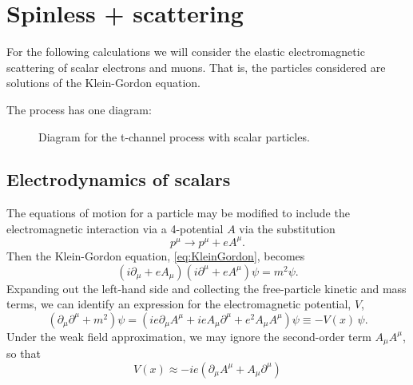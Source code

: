 \chapter{Spinless \Pelectron + \Pmuon scattering}
For the following calculations we will consider the elastic electromagnetic scattering of scalar electrons and muons. That is, the particles considered are solutions of the Klein-Gordon equation.

The process has one diagram:
\begin{figure}[h]
\centering

\caption{Diagram for the t-channel process \HepProcess{\Pelectron+\Pmuon\to\Pelectron+\Pmuon} with scalar particles.\label{fig:emuscatter}}
\end{figure}

\section{Electrodynamics of scalars}\label{sec:EMdynamics}
The equations of motion for a particle may be modified to include the electromagnetic interaction via a 4-potential $A$ via the substitution
\begin{equation}
p^\mu \rightarrow p^\mu + eA^\mu.
\end{equation}
Then the Klein-Gordon equation, \eqref{eq:KleinGordon}, becomes
\begin{equation}
\left( i\partial_\mu + eA_\mu \right)\left( i\partial^\mu + eA^\mu \right)\psi = m^2\psi.
\end{equation}
Expanding out the left-hand side and collecting the free-particle kinetic and mass terms, we can identify an expression for the electromagnetic potential, $V$,
\begin{equation}
\left( \partial_\mu\partial^\mu + m^2 \right)\psi = \left( ie\partial_\mu A^\mu + ieA_\mu\partial^\mu + e^2A_\mu A^\mu \right)\psi \equiv -V(x) \,\psi.
\end{equation}
Under the weak field approximation, we may ignore the second-order term $A_\mu A^\mu$, so that
\begin{equation}
V(x) \approx -ie\left( \partial_\mu A^\mu + A_\mu\partial^\mu \right)
\end{equation}

